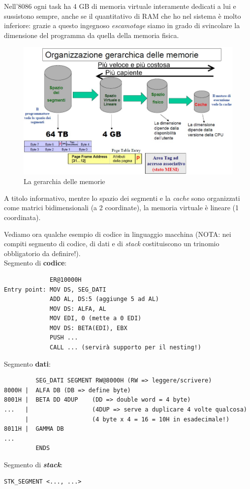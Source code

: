 Nell'8086 ogni task ha 4 GB di memoria virtuale interamente dedicati a lui e sussistono sempre, anche se il quantitativo di RAM che ho nel sistema è molto inferiore: grazie a questo ingegnoso \textit{escamotage} siamo in grado di svincolare la dimensione del programma da quella della memoria fisica.

\begin{figure}[!h]
\centering
\includegraphics[width=\columnwidth]{img/slideSacra}
\caption{La gerarchia delle memorie}
\label{fig:slideSacra}
\end{figure}

A titolo informativo, mentre lo spazio dei segmenti e la \textit{cache} sono organizzati come matrici bidimensionali (a 2 coordinate), la memoria virtuale è lineare (1 coordinata).

Vediamo ora qualche esempio di codice in linguaggio macchina (NOTA: nei compiti segmento di codice, di dati e di \textit{stack} costituiscono un trinomio obbligatorio da definire!). \\
Segmento di \textbf{codice}:
\begin{verbatim}
             ER@10000H
Entry point: MOV DS, SEG_DATI
             ADD AL, DS:5 (aggiunge 5 ad AL)
             MOV DS: ALFA, AL 
             MOV EDI, 0 (mette a 0 EDI)
             MOV DS: BETA(EDI), EBX
             PUSH ...
             CALL ... (servirà supporto per il nesting!)
\end{verbatim}
Segmento \textbf{dati}:
\begin{verbatim}
         SEG_DATI SEGMENT RW@8000H (RW => leggere/scrivere)
8000H |  ALFA DB (DB => define byte)
8001H |  BETA DD 4DUP    (DD => double word = 4 byte)
...   |                  (4DUP => serve a duplicare 4 volte qualcosa)
      |                  (4 byte x 4 = 16 = 10H in esadecimale!)
8011H |  GAMMA DB
...
         ENDS
\end{verbatim}
Segmento di \textit{\textbf{stack}}:
\begin{verbatim}
STK_SEGMENT <..., ...>
\end{verbatim}

